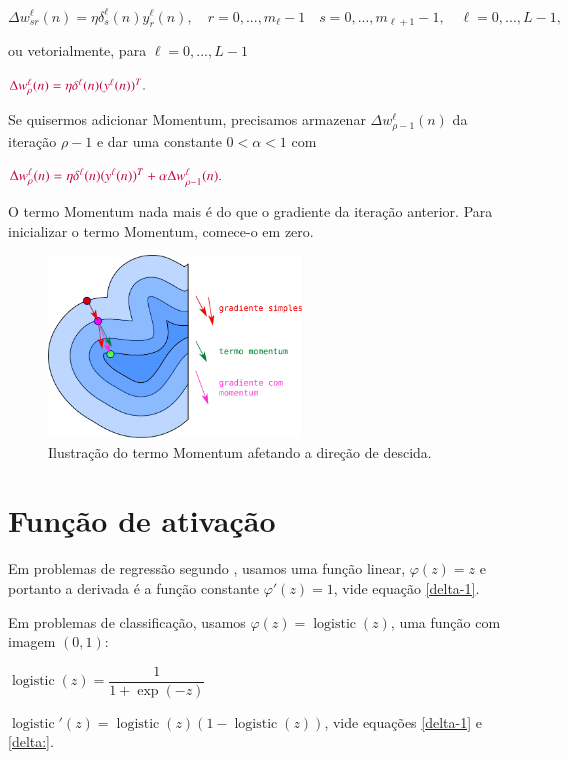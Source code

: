 \documentclass[12pt,a4paper]{article}
\DeclareMathOperator{\logistic}{logistic}
\begin{document}
\begin{equation}
\Delta w^{\ell}_{sr}(n) = \eta \delta_s^{\ell}(n)y_r^{\ell}(n),
\quad r=0,...,m_{\ell}-1 
\quad s=0,...,m_{\ell+1}-1,
\quad \ell=0,...,L-1,
\end{equation}

ou vetorialmente, para $\ell=0,...,L-1$

$\color{purple}
\Delta w^\ell_\rho(n) = \eta\delta^\ell(n)(y^\ell(n))^T.
$

Se quisermos adicionar Momentum, precisamos armazenar $\Delta w^\ell_{\rho-1}(n)$ da iteração $\rho-1$ e dar uma constante $0<\alpha<1$ com 

$\color{purple}
\Delta w^\ell_\rho(n) = \eta\delta^\ell(n)(y^\ell(n))^T
+\alpha \Delta w^\ell_{\rho-1}(n).
$

O termo Momentum nada mais é do que o gradiente da iteração anterior. Para inicializar o termo Momentum, comece-o em zero.

\begin{figure}[H]\centering
\includegraphics[width=0.6\textwidth]{momentum}
\caption{Ilustração do termo Momentum afetando a direção de descida.}
\end{figure}



\section{Função de ativação}
Em problemas de regressão segundo \cite{riedmiller}, usamos uma função linear, $\varphi(z)=z$ e portanto a derivada é a função constante $\varphi'(z)=1$, vide equação \eqref{delta-1}.

Em problemas de classificação, usamos $\varphi(z)=\logistic(z)$, uma função com imagem $(0,1)$:

$
\logistic(z) = \dfrac{1}{1+\exp(-z)}
$

$
\logistic'(z) = \logistic(z)(1-\logistic(z))
$, vide equações \eqref{delta-1} e \eqref{delta:}.
\end{document}
